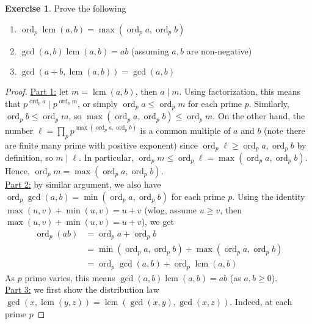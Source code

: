 \documentclass{article}
\theoremstyle{definition}
\newtheorem{exercise}{Exercise}
\begin{document}
\begin{exercise}
Prove the following
\begin{enumerate}
	\item $\operatorname{ord}_p \operatorname{lcm}(a, b) = \max(\operatorname{ord}_p a, \operatorname{ord}_p b)$
	\item $\gcd(a, b) \operatorname{lcm}(a, b) = ab$ (assuming $a, b$ are non-negative)
	\item $\gcd(a + b, \operatorname{lcm}(a, b)) = \gcd(a, b)$
\end{enumerate}
\end{exercise}
\begin{proof}
\underline{Part 1:} let $m = \operatorname{lcm}(a, b)$, then $a \mid m$. Using factorization, this means that $p^{\operatorname{ord}_p a} \mid p^{\operatorname{ord}_p m}$, or simply $\operatorname{ord}_p a \leq \operatorname{ord}_p m$ for each prime $p$. Similarly, $\operatorname{ord}_p b \leq \operatorname{ord}_p m$, so $\max(\operatorname{ord}_p a, \operatorname{ord}_p b) \leq \operatorname{ord}_p m$. On the other hand, the number $\ell = \prod_p p^{\max(\operatorname{ord}_p a, \operatorname{ord}_p b)}$ is a common multiple of $a$ and $b$ (note there are finite many prime with positive exponent) since $\operatorname{ord}_p \ell \geq \operatorname{ord}_p a, \operatorname{ord}_p b$ by definition, so $m \mid \ell$. In particular, $\operatorname{ord}_p m \leq \operatorname{ord}_p \ell = \max(\operatorname{ord}_p a, \operatorname{ord}_p b)$. Hence, $\operatorname{ord}_p m = \max(\operatorname{ord}_p a, \operatorname{ord}_p b)$.
\\
\underline{Part 2:} by similar argument, we also have $\operatorname{ord}_p \gcd(a, b) = \min(\operatorname{ord}_p a, \operatorname{ord}_p b)$ for each prime $p$. Using the identity $\max(u, v) + \min(u, v) = u + v$ (wlog, assume $u \geq v$, then $\max(u, v) + \min(u, v) = u  + v$), we get
\begin{align*}
\operatorname{ord}_p (ab) & = \operatorname{ord}_p a + \operatorname{ord}_p b \\
& = \min(\operatorname{ord}_p a, \operatorname{ord}_p b) + \max(\operatorname{ord}_p a, \operatorname{ord}_p b) \\
& = \operatorname{ord}_p \gcd(a, b) + \operatorname{ord}_p \operatorname{lcm}(a, b)
\end{align*}
As $p$ prime varies, this means $\gcd(a, b) \operatorname{lcm}(a, b) = ab$ (as $a, b \geq 0$).
\\
\underline{Part 3:} we first show the distribution law $\gcd(x, \operatorname{lcm}(y, z)) = \operatorname{lcm} (\gcd(x, y), \gcd(x, z))$. Indeed, at each prime $p$

\end{proof}
\end{document}
